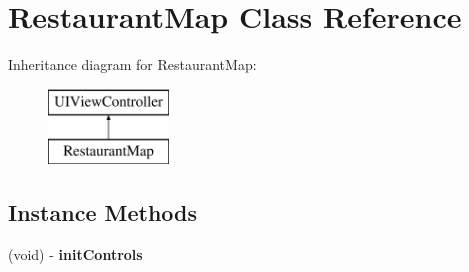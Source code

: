 \hypertarget{interface_restaurant_map}{}\section{Restaurant\+Map Class Reference}
\label{interface_restaurant_map}
Inheritance diagram for Restaurant\+Map\+:\begin{figure}[H]
\begin{center}
\leavevmode
\includegraphics[height=2.000000cm]{interface_restaurant_map}
\end{center}
\end{figure}
\subsection*{Instance Methods}
\begin{DoxyCompactItemize}
\item 
\mbox{\label{interface_restaurant_map_a1fd46f905bd580138d4436f79db70963}} 
(void) -\/ {\bfseries init\+Controls}
\end{DoxyCompactItemize}
